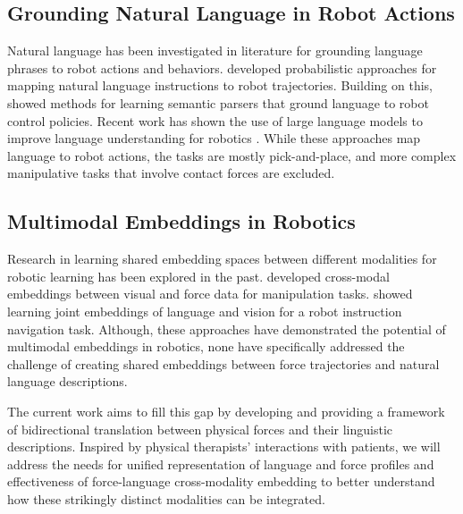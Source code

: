 \subsection{Grounding Natural Language in Robot Actions} 
Natural language has been investigated in literature for grounding language phrases to robot actions and behaviors.  \cite{tellex2011understanding} developed probabilistic approaches for mapping natural language instructions to robot trajectories. 
Building on this, \cite{matuszek2018grounded} showed methods for learning semantic parsers that ground language to robot control policies. Recent work has shown the use of large language models to improve language understanding for robotics \cite{andreas2014grounding} \cite{lynch2020language} . While these approaches map language to robot actions, the tasks are mostly pick-and-place, and more complex manipulative tasks that involve contact forces are excluded. %

\subsection{Multimodal Embeddings in Robotics}
Research in learning shared embedding spaces between different modalities for robotic learning has been explored in the past. \cite{lee2019making} developed cross-modal embeddings between visual and force data for manipulation tasks. \cite{zhang2019neural} showed learning joint embeddings of language and vision for a robot instruction navigation task. 
Although, these approaches have demonstrated the potential of multimodal embeddings in robotics, none have specifically addressed the challenge of creating shared embeddings between force trajectories and natural language descriptions. 

The current work aims to fill this gap by developing and providing a framework of bidirectional translation between physical forces and their linguistic descriptions. Inspired by physical therapists' interactions with patients, we will address the needs for unified representation of language and force profiles and effectiveness of force-language cross-modality embedding to better understand how these strikingly distinct modalities can be integrated.

%